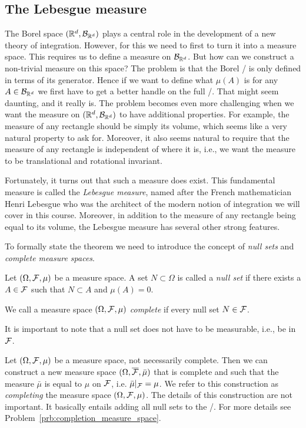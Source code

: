 \subsection{The Lebesgue measure}

The Borel space $(\mathbb R^d, \mathcal B_{\mathbb R^d})$ plays a central role in the development of a new theory of integration. However, for this we need to first to turn it into a measure space. This requires us to define a measure on $\mathcal B_{\mathbb R^d}$. But how can we construct a non-trivial measure on this space? The problem is that the Borel \sigalg/ is only defined in terms of its generator. Hence if we want to define what $\mu(A)$ is for any $A \in \mathcal B_{\mathbb R^d}$ we first have to get a better handle on the full \sigalg/. That might seem daunting, and it really is. The problem becomes even more challenging when we want the measure on $(\mathbb R^d, \mathcal B_{\mathbb R^d})$ to have additional properties. For example, the measure of any rectangle should be simply its volume, which seems like a very natural property to ask for. Moreover, it also seems natural to require that the measure of any rectangle is independent of where it is, i.e., we want the measure to be translational and rotational invariant.

Fortunately, it turns out that such a measure does exist. This fundamental measure is called the \emph{Lebesgue measure}, named after the French mathematician Henri Lebesgue who was the architect of the modern notion of integration we will cover in this course. Moreover, in addition to the measure of any rectangle being equal to its volume, the Lebesgue measure has several other strong features. 

To formally state the theorem we need to introduce the concept of \emph{null sets} and \emph{complete measure spaces}.

\begin{definition}
Let $(\Omega, \mathcal F, \mu)$ be a measure space. A set $N \subset \Omega$ is called a \emph{null set} if there exists a $A \in \mathcal F$ such that $N \subset A$ and $\mu(A) = 0$.

We call a measure space $(\Omega, \mathcal F, \mu)$ \emph{complete} if every null set $N \in \mathcal F$. 
\end{definition}

It is important to note that a null set does not have to be measurable, i.e., be in $\mathcal F$. 


Let $(\Omega, \mathcal F, \mu)$ be a measure space, not necessarily complete. Then we can construct a new measure space $(\Omega, \overline{\mathcal F}, \bar{\mu})$ that is complete and such that the measure $\bar{\mu}$ is equal to $\mu$ on $\mathcal F$, i.e. $\bar{\mu}|_{\mathcal F} = \mu$. We refer to this construction as \emph{completing} the measure space $(\Omega, \mathcal F, \mu)$. The details of this construction are not important. It basically entails adding all null sets to the \sigalg/. For more details see Problem~\ref{prb:completion_measure_space}.

